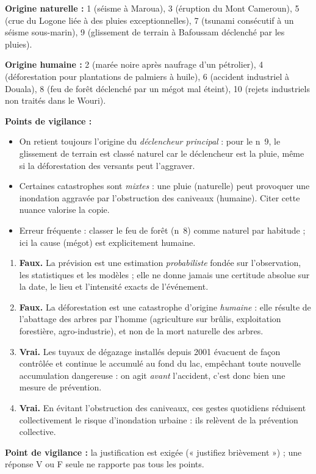 \documentclass[11pt]{article}
\begin{document}
\begin{corrige}
\textbf{Origine naturelle :} 1 (séisme à Maroua), 3 (éruption du Mont Cameroun), 5 (crue du Logone liée à des pluies exceptionnelles), 7 (tsunami consécutif à un séisme sous-marin), 9 (glissement de terrain à Bafoussam déclenché par les pluies).

\textbf{Origine humaine :} 2 (marée noire après naufrage d'un pétrolier), 4 (déforestation pour plantations de palmiers à huile), 6 (accident industriel à Douala), 8 (feu de forêt déclenché par un mégot mal éteint), 10 (rejets industriels non traités dans le Wouri).

\textbf{Points de vigilance :}
\begin{itemize}
\item On retient toujours l'origine du \emph{déclencheur principal} : pour le n\textdegree~9, le glissement de terrain est classé naturel car le déclencheur est la pluie, même si la déforestation des versants peut l'aggraver.
\item Certaines catastrophes sont \emph{mixtes} : une pluie (naturelle) peut provoquer une inondation aggravée par l'obstruction des caniveaux (humaine). Citer cette nuance valorise la copie.
\item Erreur fréquente : classer le feu de forêt (n\textdegree~8) comme naturel par habitude ; ici la cause (mégot) est explicitement humaine.
\end{itemize}
\end{corrige}

\begin{corrige}
\begin{enumerate}
\item \textbf{Faux.} La prévision est une estimation \emph{probabiliste} fondée sur l'observation, les statistiques et les modèles ; elle ne donne jamais une certitude absolue sur la date, le lieu et l'intensité exacts de l'événement.
\item \textbf{Faux.} La déforestation est une catastrophe d'origine \emph{humaine} : elle résulte de l'abattage des arbres par l'homme (agriculture sur brûlis, exploitation forestière, agro-industrie), et non de la mort naturelle des arbres.
\item \textbf{Vrai.} Les tuyaux de dégazage installés depuis 2001 évacuent de façon contrôlée et continue le  accumulé au fond du lac, empêchant toute nouvelle accumulation dangereuse : on agit \emph{avant} l'accident, c'est donc bien une mesure de prévention.
\item \textbf{Vrai.} En évitant l'obstruction des caniveaux, ces gestes quotidiens réduisent collectivement le risque d'inondation urbaine : ils relèvent de la prévention collective.
\end{enumerate}
\textbf{Point de vigilance :} la justification est exigée (« justifiez brièvement ») ; une réponse V ou F seule ne rapporte pas tous les points.
\end{corrige}
\end{document}
